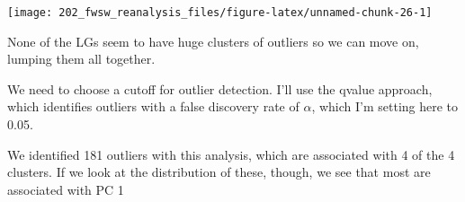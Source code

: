 \documentclass[]{article}
\newenvironment{Shaded}{\begin{snugshade}}{\end{snugshade}}
\newcommand{\KeywordTok}[1]{\textcolor[rgb]{0.13,0.29,0.53}{\textbf{#1}}}
\newcommand{\DataTypeTok}[1]{\textcolor[rgb]{0.13,0.29,0.53}{#1}}
\newcommand{\DecValTok}[1]{\textcolor[rgb]{0.00,0.00,0.81}{#1}}
\newcommand{\FloatTok}[1]{\textcolor[rgb]{0.00,0.00,0.81}{#1}}
\newcommand{\StringTok}[1]{\textcolor[rgb]{0.31,0.60,0.02}{#1}}
\newcommand{\CommentTok}[1]{\textcolor[rgb]{0.56,0.35,0.01}{\textit{#1}}}
\newcommand{\OtherTok}[1]{\textcolor[rgb]{0.56,0.35,0.01}{#1}}
\newcommand{\ControlFlowTok}[1]{\textcolor[rgb]{0.13,0.29,0.53}{\textbf{#1}}}
\newcommand{\OperatorTok}[1]{\textcolor[rgb]{0.81,0.36,0.00}{\textbf{#1}}}
\newcommand{\NormalTok}[1]{#1}
\begin{document}
\begin{Shaded}
\end{Shaded}

\texttt{[image: 202\_fwsw\_reanalysis\_files/figure-latex/unnamed-chunk-26-1]}

None of the LGs seem to have huge clusters of outliers so we can move
on, lumping them all together.

We need to choose a cutoff for outlier detection. I'll use the qvalue
approach, which identifies outliers with a false discovery rate of
\(\alpha\), which I'm setting here to 0.05.

\begin{Shaded}
\end{Shaded}

We identified 181 outliers with this analysis, which are associated with
4 of the 4 clusters. If we look at the distribution of these, though, we
see that most are associated with PC 1
\end{document}
